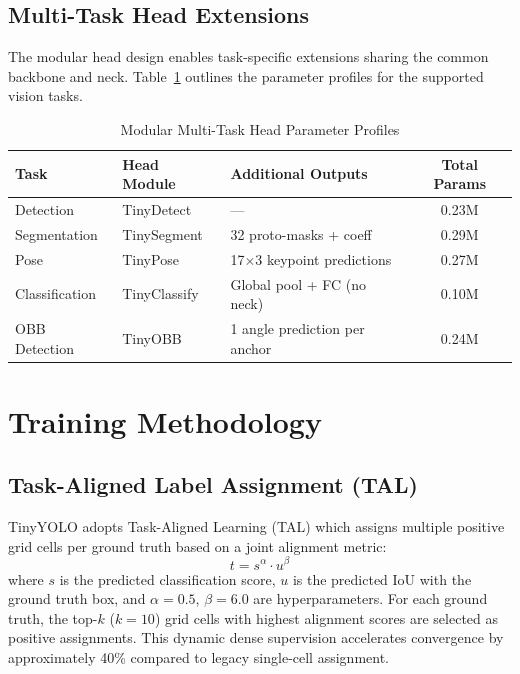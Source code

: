 \documentclass[journal]{IEEEtran}
\begin{document}
\subsection{Multi-Task Head Extensions}
The modular head design enables task-specific extensions sharing the common backbone and neck. Table~\ref{tab:multi_task_heads} outlines the parameter profiles for the supported vision tasks.

\begin{table}[h]
\centering
\caption{Modular Multi-Task Head Parameter Profiles}
\label{tab:multi_task_heads}
\setlength{\tabcolsep}{4pt}
\begin{tabular}{lllc}
\toprule
Task & Head Module & Additional Outputs & Total Params \\
\midrule
Detection & TinyDetect & --- & 0.23M \\
Segmentation & TinySegment & 32 proto-masks + coeff & 0.29M \\
Pose & TinyPose & 17$\times$3 keypoint predictions & 0.27M \\
Classification & TinyClassify & Global pool + FC (no neck) & 0.10M \\
OBB Detection & TinyOBB & 1 angle prediction per anchor & 0.24M \\
\bottomrule
\end{tabular}
\end{table}

\section{Training Methodology}

\subsection{Task-Aligned Label Assignment (TAL)}
TinyYOLO adopts Task-Aligned Learning (TAL) \cite{feng2021tood} which assigns multiple positive grid cells per ground truth based on a joint alignment metric:
\begin{equation}
t = s^\alpha \cdot u^\beta
\end{equation}
where $s$ is the predicted classification score, $u$ is the predicted IoU with the ground truth box, and $\alpha = 0.5$, $\beta = 6.0$ are hyperparameters. For each ground truth, the top-$k$ ($k = 10$) grid cells with highest alignment scores are selected as positive assignments. This dynamic dense supervision accelerates convergence by approximately 40\% compared to legacy single-cell assignment.
\end{document}
